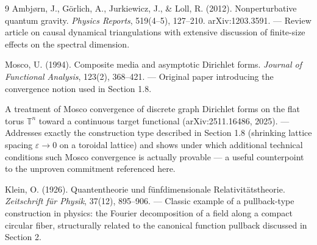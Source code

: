 \begin{thebibliography}{9}
Ambjørn, J., Görlich, A., Jurkiewicz, J., \& Loll, R. (2012). Nonperturbative
quantum gravity. \emph{Physics Reports}, 519(4--5), 127--210.
arXiv:1203.3591. — Review article on causal dynamical triangulations with
extensive discussion of finite-size effects on the spectral dimension.

Mosco, U. (1994). Composite media and asymptotic Dirichlet forms.
\emph{Journal of Functional Analysis}, 123(2), 368--421. — Original paper
introducing the convergence notion used in Section 1.8.

A treatment of Mosco convergence of discrete graph Dirichlet forms on the
flat torus $\mathbb{T}^n$ toward a continuous target functional
(arXiv:2511.16486, 2025). — Addresses exactly the construction type
described in Section 1.8 (shrinking lattice spacing $\varepsilon\to0$ on
a toroidal lattice) and shows under which additional technical conditions
such Mosco convergence is actually provable — a useful counterpoint to
the unproven commitment referenced here.

Klein, O. (1926). Quantentheorie und fünfdimensionale Relativitätstheorie.
\emph{Zeitschrift für Physik}, 37(12), 895--906. — Classic example of a
pullback-type construction in physics: the Fourier decomposition of a
field along a compact circular fiber, structurally related to the
canonical function pullback discussed in Section 2.
\end{thebibliography}
